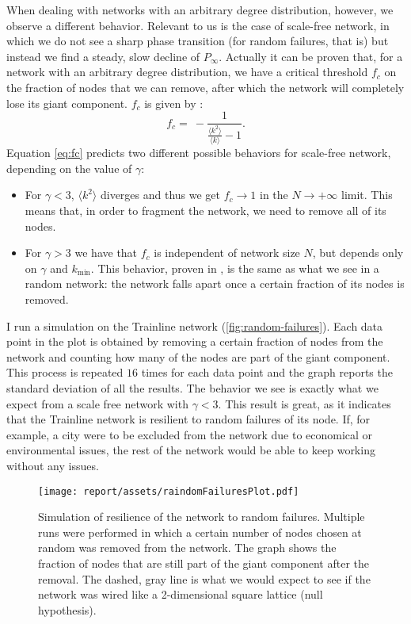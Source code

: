 When dealing with networks with an arbitrary degree distribution, however, we observe a different behavior. Relevant to us is the case of scale-free network, in which we do not see a sharp phase transition (for random failures, that is) but instead we find a steady, slow decline of $P_\infty$. Actually it can be proven that, for a network with an arbitrary degree distribution, we have a critical threshold $f_c$ on the fraction of nodes that we can remove, after which the network will completely lose its giant component. $f_c$ is given by \cite{barabasi16, molloyreed}:
\begin{equation}
    f_c = \ - \frac 1 {\frac {\langle k ^2 \rangle}{\langle k \rangle} - 1}.
    \label{eq:fc}
\end{equation}
Equation \eqref{eq:fc} predicts two different possible behaviors for scale-free network, depending on the value of $\gamma$:
\begin{itemize}
    \item For $\gamma < 3$, $\langle k^2 \rangle$ diverges and thus we get $f_c \to 1$ in the $N \to +\infty$ limit. This means that, in order to fragment the network, we need to remove all of its nodes.
    \item For $\gamma > 3$ we have that $f_c$ is independent of network size $N$, but depends only on $\gamma$ and $k_{\min}$. This behavior, proven in \cite{barabasi}, is the same as what we see in a random network: the network falls apart once a certain fraction of its nodes is removed.
\end{itemize}

I run a simulation on the Trainline network (\autoref{fig:random-failures}). Each data point in the plot is obtained by removing a certain fraction of nodes from the network and counting how many of the nodes are part of the giant component. This process is repeated $16$ times for each data point and the graph reports the standard deviation of all the results. The behavior we see is exactly what we expect from a scale free network with $\gamma < 3$. This result is great, as it indicates that the Trainline network is resilient to random failures of its node.
If, for example, a city were to be excluded from the network due to economical or environmental issues, the rest of the network would be able to keep working without any issues.

\begin{figure}[h]
    \centering
    \texttt{[image: report/assets/raindomFailuresPlot.pdf]}
    \caption{Simulation of resilience of the network to random failures. Multiple runs were performed in which a certain number of nodes chosen at random was removed from the network. The graph shows the fraction of nodes that are still part of the giant component after the removal. The dashed, gray line is what we would expect to see if the network was wired like a 2-dimensional square lattice (null hypothesis).}
    \label{fig:random-failures}
\end{figure}


